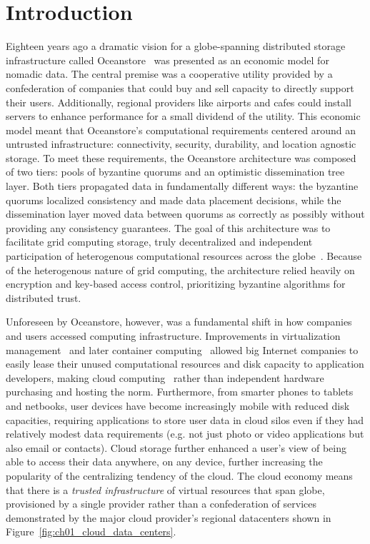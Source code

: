 
\renewcommand{\thechapter}{1}

\chapter{Introduction}
\label{ch:introduction}

Eighteen years ago a dramatic vision for a globe-spanning distributed storage infrastructure called Oceanstore~\cite{oceanstore} was presented as an economic model for nomadic data.
The central premise was a cooperative utility provided by a confederation of companies that could buy and sell capacity to directly support their users. Additionally, regional providers like airports and cafes could install servers to enhance performance for a small dividend of the utility.
This economic model meant that Oceanstore's computational requirements centered around an untrusted infrastructure: connectivity, security, durability, and location agnostic storage.
To meet these requirements, the Oceanstore architecture was composed of two tiers: pools of byzantine quorums and an optimistic dissemination tree layer.
Both tiers propagated data in fundamentally different ways: the byzantine quorums localized consistency and made data placement decisions, while the dissemination layer moved data between quorums as correctly as possibly without providing any consistency guarantees.
The goal of this architecture was to facilitate grid computing storage, truly decentralized and independent participation of heterogenous computational resources across the globe~\cite{grid_computing}.
Because of the heterogenous nature of grid computing, the architecture relied heavily on encryption and key-based access control, prioritizing byzantine algorithms for distributed trust.

Unforeseen by Oceanstore, however, was a fundamental shift in how companies and users accessed computing infrastructure.
Improvements in virtualization management~\cite{eucalyptus} and later container computing~\cite{docker} allowed big Internet companies to easily lease their unused computational resources and disk capacity to application developers, making cloud computing~\cite{cloud_computing} rather than independent hardware purchasing and hosting the norm.
Furthermore, from smarter phones to tablets and netbooks, user devices have become increasingly mobile with reduced disk capacities, requiring applications to store user data in cloud silos even if they had relatively modest data requirements (e.g. not just photo or video applications but also email or contacts).
Cloud storage further enhanced a user's view of being able to access their data anywhere, on any device, further increasing the popularity of the centralizing tendency of the cloud.
The cloud economy means that there is a \emph{trusted infrastructure} of virtual resources that span globe, provisioned by a single provider rather than a confederation of services demonstrated by the major cloud provider's regional datacenters shown in Figure~\ref{fig:ch01_cloud_data_centers}.

